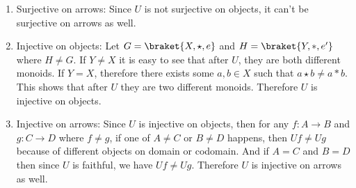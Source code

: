 \begin{enumerate}[label=\ilabel]
        \item 
            Surjective on arrows: Since $U$ is not surjective on objects, it can't be surjective on arrows as well.
        
        \item
            Injective on objects: Let $G = \braket{X, \star, e}$ and $H = \braket{Y, \ast, e'}$ where $H \ne G$. If $Y \ne X$ it is easy to see that after $U$, they are both different monoids. If $Y = X$, therefore there exists some $a, b \in X$ such that $a \star b \ne a \ast b$. This shows that after $U$ they are two different monoids. Therefore $U$ is injective on objects. 
        \item
            Injective on arrows: Since $U$ is injective on objects, then for any $f: A \to B$ and $g: C \to D$ where $f \ne g$, if one of $A \ne C$ or $B \ne D$ happens, then $Uf \ne Ug$ because of different objects on domain or codomain. And if $A = C$ and $B = D$ then since $U$ is faithful, we have $Uf \ne Ug$. Therefore $U$ is injective on arrows as well.
    \end{enumerate}

